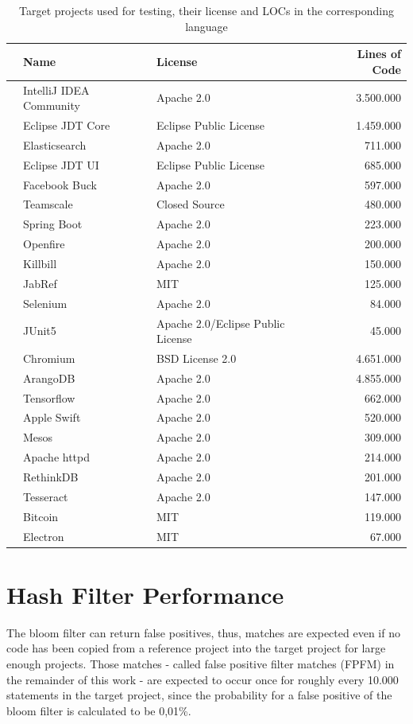 \begin{table}[ht]
	\centering
	\begin{tabular}{l|llr}
		& \textbf{Name} & \textbf{License} & \textbf{Lines of Code} \\
		\hline 
		\parbox[t]{2mm}{} 
		& IntelliJ IDEA Community & Apache 2.0 & 3.500.000 \\
		& Eclipse JDT Core & Eclipse Public License & 1.459.000 \\
		& Elasticsearch & Apache 2.0 & 711.000 \\
		& Eclipse JDT UI & Eclipse Public License & 685.000 \\
		& Facebook Buck & Apache 2.0 & 597.000 \\
		& Teamscale & Closed Source & 480.000 \\
		& Spring Boot & Apache 2.0 & 223.000 \\
		& Openfire & Apache 2.0 & 200.000 \\
		& Killbill & Apache 2.0 & 150.000 \\
		& JabRef & MIT & 125.000 \\
		& Selenium & Apache 2.0 & 84.000 \\
		& JUnit5 & Apache 2.0/Eclipse Public License & 45.000 \\
		\hline 
		\parbox[t]{2mm}{} 
		& Chromium & BSD License 2.0 & 4.651.000 \\
		& ArangoDB & Apache 2.0 & 4.855.000 \\
		& Tensorflow & Apache 2.0 & 662.000 \\
		& Apple Swift & Apache 2.0 & 520.000 \\
		& Mesos & Apache 2.0 & 309.000 \\
		& Apache httpd & Apache 2.0 & 214.000 \\
		& RethinkDB & Apache 2.0 & 201.000 \\
		& Tesseract & Apache 2.0 & 147.000 \\
		& Bitcoin & MIT & 119.000 \\
		& Electron & MIT & 67.000 \\
	\end{tabular}
	\caption{Target projects used for testing, their license and LOCs in the corresponding language}\label{table:target_projects}
\end{table}


\section{Hash Filter Performance}\label{section:evaluation/findings/hash_filter_performance}
The bloom filter can return false positives, thus, matches are expected even if no code has been copied from a reference project into the target project for large enough projects.
Those matches - called false positive filter matches (FPFM)  in the remainder of this work - are expected to occur once for roughly every 10.000 statements in the target project, since the probability for a false positive of the bloom filter is calculated to be 0,01\%. 

